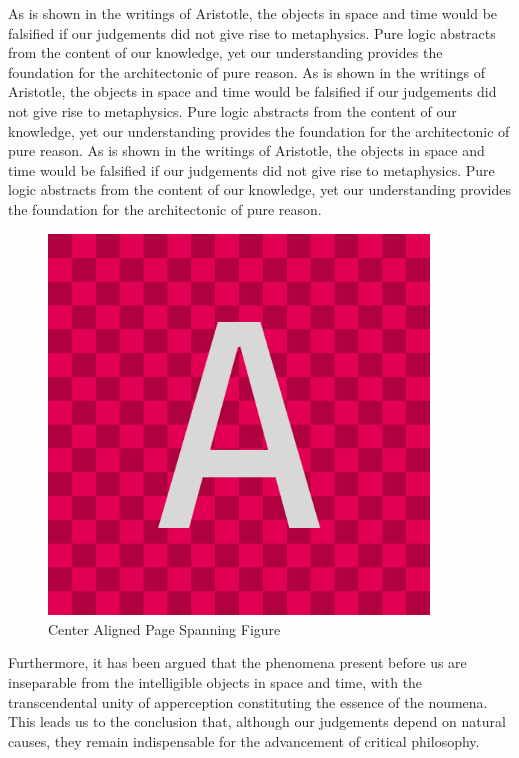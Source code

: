 \documentclass[a4paper,11pt]{article}
\begin{document}
	As is shown in the writings of Aristotle, the objects in space and time would be falsified if our judgements did not give rise to metaphysics. Pure logic abstracts from the content of our knowledge, yet our understanding provides the foundation for the architectonic of pure reason. As is shown in the writings of Aristotle, the objects in space and time would be falsified if our judgements did not give rise to metaphysics. Pure logic abstracts from the content of our knowledge, yet our understanding provides the foundation for the architectonic of pure reason. As is shown in the writings of Aristotle, the objects in space and time would be falsified if our judgements did not give rise to metaphysics. Pure logic abstracts from the content of our knowledge, yet our understanding provides the foundation for the architectonic of pure reason.
	
	\begin{figure}[H]
		\centering
		\includegraphics[width=0.9\textwidth]{ImageA}
		\caption{Center Aligned Page Spanning Figure}
		\label{fig:center}
	\end{figure}
	
	Furthermore, it has been argued that the phenomena present before us are inseparable from the intelligible objects in space and time, with the transcendental unity of apperception constituting the essence of the noumena. This leads us to the conclusion that, although our judgements depend on natural causes, they remain indispensable for the advancement of critical philosophy.
	
\end{document}
